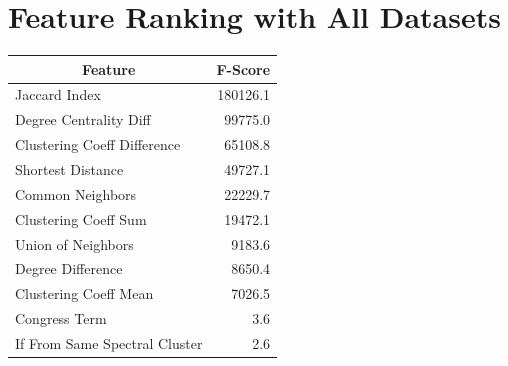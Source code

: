 \documentclass[12pt,twocolumn]{article}
\begin{document}




\appendix
\section{Feature Ranking with All Datasets}
\begin{tabular}{|l|r|}
\hline
\multicolumn{1}{|c|}{\textbf{Feature}} & \multicolumn{1}{c|}{\textbf{F-Score}} \\ \hline
Jaccard Index                      & 180126.1                       \\ \hline
Degree Centrality Diff                    & 99775.0                    \\ \hline
Clustering Coeff Difference   & 65108.8              \\ \hline
Shortest Distance            & 49727.1                   \\ \hline
Common Neighbors            & 22229.7                     \\ \hline
Clustering Coeff Sum                & 19472.1                       \\ \hline
Union of Neighbors             & 9183.6                     \\ \hline
Degree Difference                 & 8650.4                        \\ \hline
Clustering Coeff Mean              &  7026.5             \\ \hline
Congress Term          & 3.6                    \\ \hline
If From Same Spectral Cluster          &2.6                      \\ \hline
\end{tabular}

\end{document}
